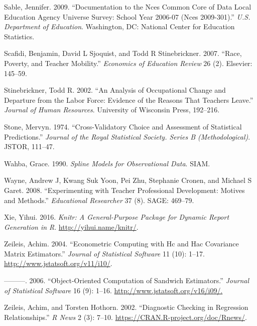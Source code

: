 \documentclass[12pt,]{article}
\begin{document}
\hypertarget{ref-sable}{}
Sable, Jennifer. 2009. ``Documentation to the Nces Common Core of Data
Local Education Agency Universe Survey: School Year 2006-07 (Nces
2009-301).'' \emph{U.S. Department of Education}. Washington, DC:
National Center for Education Statistics.

\hypertarget{ref-scafidi}{}
Scafidi, Benjamin, David L Sjoquist, and Todd R Stinebrickner. 2007.
``Race, Poverty, and Teacher Mobility.'' \emph{Economics of Education
Review} 26 (2). Elsevier: 145--59.

\hypertarget{ref-stinebrickner}{}
Stinebrickner, Todd R. 2002. ``An Analysis of Occupational Change and
Departure from the Labor Force: Evidence of the Reasons That Teachers
Leave.'' \emph{Journal of Human Resources}. University of Wisconsin
Press, 192--216.

\hypertarget{ref-stone}{}
Stone, Mervyn. 1974. ``Cross-Validatory Choice and Assessment of
Statistical Predictions.'' \emph{Journal of the Royal Statistical
Society. Series B (Methodological)}. JSTOR, 111--47.

\hypertarget{ref-wahba}{}
Wahba, Grace. 1990. \emph{Spline Models for Observational Data}. SIAM.

\hypertarget{ref-wayne}{}
Wayne, Andrew J, Kwang Suk Yoon, Pei Zhu, Stephanie Cronen, and Michael
S Garet. 2008. ``Experimenting with Teacher Professional Development:
Motives and Methods.'' \emph{Educational Researcher} 37 (8). SAGE:
469--79.

\hypertarget{ref-xie}{}
Xie, Yihui. 2016. \emph{Knitr: A General-Purpose Package for Dynamic
Report Generation in R}. \url{http://yihui.name/knitr/}.

\hypertarget{ref-zeileis2004}{}
Zeileis, Achim. 2004. ``Econometric Computing with Hc and Hac Covariance
Matrix Estimators.'' \emph{Journal of Statistical Software} 11 (10):
1--17. \url{http://www.jstatsoft.org/v11/i10/}.

\hypertarget{ref-zeileis2006}{}
---------. 2006. ``Object-Oriented Computation of Sandwich Estimators.''
\emph{Journal of Statistical Software} 16 (9): 1--16.
\url{http://www.jstatsoft.org/v16/i09/.}

\hypertarget{ref-zeileis2002}{}
Zeileis, Achim, and Torsten Hothorn. 2002. ``Diagnostic Checking in
Regression Relationships.'' \emph{R News} 2 (3): 7--10.
\url{https://CRAN.R-project.org/doc/Rnews/}.
\end{document}
